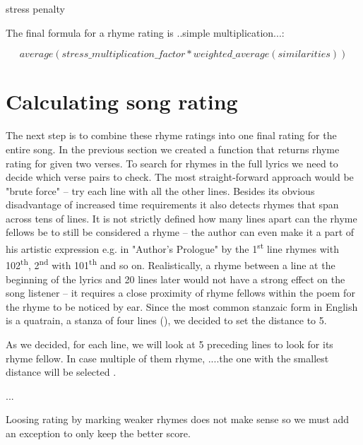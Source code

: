 stress penalty


The final formula for a rhyme rating is ..simple multiplication...:

\[average(stress\_multiplication\_factor*weighted\_average(similarities))\]


\section{Calculating song rating}

The next step is to combine these rhyme ratings into one final rating for the entire song. In the previous section we created a function that returns rhyme rating for given two verses. To search for rhymes in the full lyrics we need to decide which verse pairs to check. The most straight-forward approach would be "brute force" -- try each line with all the other lines. Besides its obvious disadvantage of increased time requirements it also detects rhymes that span across tens of lines. It is not strictly defined how many lines apart can the rhyme fellows be to still be considered a rhyme -- the author can even make it a part of his artistic expression  e.g. in "Author's Prologue" by \cite{thomas1952author} the 1\textsuperscript{st} line rhymes with 102\textsuperscript{th}, 2\textsuperscript{nd} with 101\textsuperscript{th} and so on. Realistically, a rhyme between a line at the beginning of the lyrics and 20 lines later would not have a strong effect on the song listener -- it requires a close proximity of rhyme fellows within the poem for the rhyme to be noticed by ear. Since the most common stanzaic form in English is a quatrain, a stanza of four lines (\cite{eastman1970norton}), we decided to set the distance to 5. 


As we decided, for each line, we will look at 5 preceding lines to look for its rhyme fellow. In case multiple of them rhyme, ....the one with the smallest distance will be selected .

...

 Loosing rating by marking weaker rhymes does not make sense so we must add an exception to only keep the better score.

